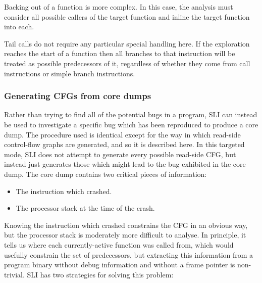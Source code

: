 Backing out of a function is more complex.  In this case, the analysis
must consider all possible callers of the target function and inline
the target function into each.  


Tail calls do not require any particular special handling here.  If
the exploration reaches the start of a function then all branches to
that instruction will be treated as possible predecessors of it,
regardless of whether they come from call instructions or simple
branch instructions.

\subsubsection{Generating CFGs from core dumps}

Rather than trying to find all of the potential bugs in a program, SLI
can instead be used to investigate a specific bug which has been
reproduced to produce a core dump.  The procedure used is identical
except for the way in which read-side control-flow graphs are
generated, and so it is described here.  In this targeted mode, SLI
does not attempt to generate every possible read-side CFG, but instead
just generates those which might lead to the bug exhibited in the core
dump.  The core dump contains two critical pieces of information:

\begin{itemize}
\item
  The instruction which crashed.
\item
  The processor stack at the time of the crash.
\end{itemize}

Knowing the instruction which crashed constrains the CFG in an obvious
way, but the processor stack is moderately more difficult to analyse.
In principle, it tells us where each currently-active function was
called from, which would usefully constrain the set of predecessors,
but extracting this information from a program binary without debug
information and without a frame pointer is non-trivial.  SLI has two
strategies for solving this problem:

